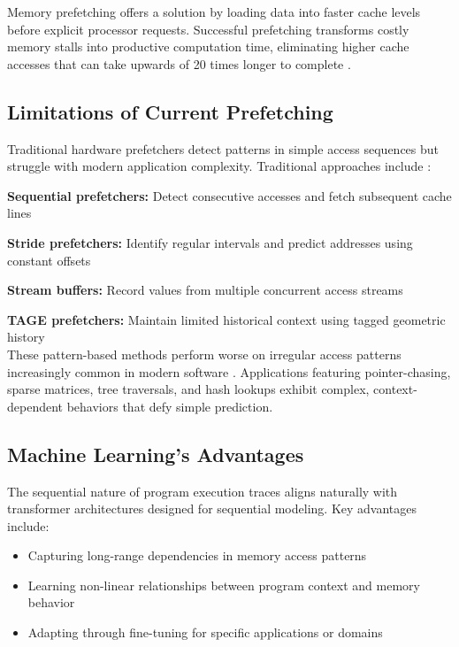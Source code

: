 \documentclass[sigconf,authorversion,nonacm]{acmart}
\begin{document}
Memory prefetching offers a solution by loading data into faster cache levels before explicit processor requests. Successful prefetching transforms costly memory stalls into productive computation time, eliminating higher cache accesses that can take upwards of 20 times longer to complete \cite{wilton2002cacti}.

\subsection{Limitations of Current Prefetching}
Traditional hardware prefetchers detect patterns in simple access sequences but struggle with modern application complexity. Traditional approaches include \cite{mittal2016survey}:

\textbf{Sequential prefetchers:} Detect consecutive accesses and fetch subsequent cache lines

\textbf{Stride prefetchers:} Identify regular intervals and predict addresses using constant offsets  

\textbf{Stream buffers:} Record values from multiple concurrent access streams

\textbf{TAGE prefetchers:} Maintain limited historical context using tagged geometric history\\

These pattern-based methods perform worse on irregular access patterns increasingly common in modern software \cite{lee2012prefetching}. Applications featuring pointer-chasing, sparse matrices, tree traversals, and hash lookups exhibit complex, context-dependent behaviors that defy simple prediction. 

\subsection{Machine Learning's Advantages}

The sequential nature of program execution traces aligns naturally with transformer architectures designed for sequential modeling. Key advantages include:
\begin{itemize}
    \item Capturing long-range dependencies in memory access patterns
    \item Learning non-linear relationships between program context and memory behavior
    \item Adapting through fine-tuning for specific applications or domains
\end{itemize}
\end{document}

